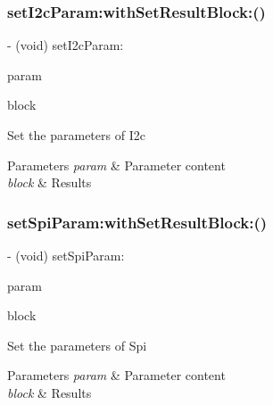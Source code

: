 \subsubsection{\texorpdfstring{set\+I2c\+Param\+:with\+Set\+Result\+Block\+:()}{setI2cParam:withSetResultBlock:()}}
{\footnotesize\ttfamily -\/ (void) set\+I2c\+Param\+: \begin{DoxyParamCaption}\item[{(\hyperlink{struct_p_v_s_d_k___m_o_u_n_t_a_p_i___i2_c___p_a_r_a_m}{P\+V\+S\+D\+K\+\_\+\+M\+O\+U\+N\+T\+A\+P\+I\+\_\+\+I2\+C\+\_\+\+P\+A\+R\+AM})}]{param }\item[{withSetResultBlock:(P\+V\+Set\+Param\+Result\+Block)}]{block }\end{DoxyParamCaption}}

Set the parameters of I2c


\begin{DoxyParams}{Parameters}
{\em param} & Parameter content \\
\hline
{\em block} & Results \\
\hline
\end{DoxyParams}
\mbox{\label{interface_p_v_mount_a17df266112343fd8d0f992002a09a3f4}} 
\subsubsection{\texorpdfstring{set\+Spi\+Param\+:with\+Set\+Result\+Block\+:()}{setSpiParam:withSetResultBlock:()}}
{\footnotesize\ttfamily -\/ (void) set\+Spi\+Param\+: \begin{DoxyParamCaption}\item[{(\hyperlink{struct_p_v_s_d_k___m_o_u_n_t_a_p_i___s_p_i___p_a_r_a_m}{P\+V\+S\+D\+K\+\_\+\+M\+O\+U\+N\+T\+A\+P\+I\+\_\+\+S\+P\+I\+\_\+\+P\+A\+R\+AM})}]{param }\item[{withSetResultBlock:(P\+V\+Set\+Param\+Result\+Block)}]{block }\end{DoxyParamCaption}}

Set the parameters of Spi


\begin{DoxyParams}{Parameters}
{\em param} & Parameter content \\
\hline
{\em block} & Results \\
\hline
\end{DoxyParams}
\mbox{\label{interface_p_v_mount_a578e957011559369a1448b7c9fd1b963}} 
